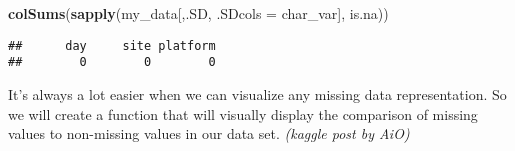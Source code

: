 \documentclass[]{article}
\newenvironment{Shaded}{\begin{snugshade}}{\end{snugshade}}
\newcommand{\KeywordTok}[1]{\textcolor[rgb]{0.13,0.29,0.53}{\textbf{{#1}}}}
\newcommand{\DataTypeTok}[1]{\textcolor[rgb]{0.13,0.29,0.53}{{#1}}}
\newcommand{\NormalTok}[1]{{#1}}
\begin{document}
\begin{Shaded}
\begin{Highlighting}[]
\KeywordTok{colSums}\NormalTok{(}\KeywordTok{sapply}\NormalTok{(my_data[,.SD, }\DataTypeTok{.SDcols =} \NormalTok{char_var], is.na))}
\end{Highlighting}
\end{Shaded}

\begin{verbatim}
##      day     site platform 
##        0        0        0
\end{verbatim}

\newline
\newline

It's always a lot easier when we can visualize any missing data
representation. So we will create a function that will visually display
the comparison of missing values to non-missing values in our data set.
\emph{(kaggle post by AiO)}
\end{document}
